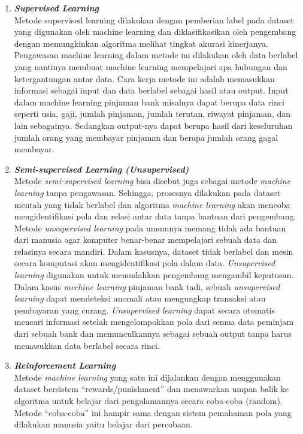 \begin{enumerate}
\begin{figure} [ht]
      \label{fig:MechineLearning}
    \end{figure}
    \begin{enumerate}[nolistsep]
      \item \textit{\textbf{Supervised Learning}}\\
        Metode supervised learning dilakukan dengan pemberian label pada dataset  yang digunakan oleh machine learning dan diklasifikasikan oleh pengembang dengan memungkinkan algoritma melihat tingkat akurasi kinerjanya. Pengawasan machine learning dalam metode ini dilakukan oleh data berlabel yang nantinya membuat machine learning mempelajari apa hubungan dan ketergantungan antar data.
        Cara kerja metode ini adalah memasukkan informasi sebagai input dan data berlabel sebagai hasil atau output. Input dalam machine learning pinjaman bank misalnya dapat berupa data rinci seperti usia, gaji, jumlah pinjaman, jumlah terutan, riwayat pinjaman, dan lain sebagainya. Sedangkan output-nya dapat berupa hasil dari keseluruhan jumlah orang yang membayar pinjaman dan berapa jumlah orang gagal membayar.
      \item \textit{\textbf{Semi-supervised Learning (Unsupervised)}} \\
        Metode \textit{semi-supervised learning} bisa disebut juga sebagai metode \textit{machine learning} tanpa pengawasan. Sehingga, prosesnya dilakukan pada dataset mentah yang tidak berlabel dan algoritma \textit{machine learning} akan mencoba mengidentifikasi pola dan relasi antar data tanpa bantuan dari pengembang.
        Metode \textit{unsupervised learning} pada umumnya memang tidak ada bantuan dari manusia agar komputer benar-benar mempelajari sebuah data dan relasinya secara mandiri. Dalam kasusnya, dataset tidak berlabel dan mesin secara komputasi akan mengidentifikasi pola dalam data. \textit{Unsupervised learning} digunakan untuk memudahkan pengembang mengambil keputusan.
        Dalam kasus \textit{mechine learning} pinjaman bank tadi, sebuah \textit{unsupervised learning} dapat mendeteksi anomali atau mengungkap transaksi atau pembayaran yang curang. \textit{Unsupervised learning}  dapat secara otomatis mencari informasi setelah mengelompokkan pola dari semua data peminjam dari sebuah bank dan memunculkannya sebagai sebuah output tanpa harus memasukkan data berlabel secara rinci.
      \item \textit{\textbf{Reinforcement Learning}} \\
        Metode \textit{machine learning} yang satu ini dijalankan dengan menggunakan dataset bersistem “rewards/punishment” dan menawarkan umpan balik ke algoritma untuk belajar dari pengalamannya secara coba-coba (random). Metode “coba-coba” ini hampir sama dengan sistem pemahaman pola yang dilakukan manusia yaitu belajar dari percobaan.


\end{enumerate}
\end{enumerate}

